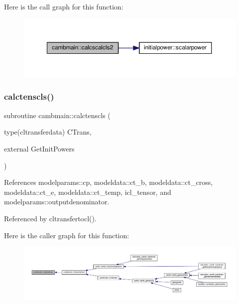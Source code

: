 Here is the call graph for this function\+:
\nopagebreak
\begin{figure}[H]
\begin{center}
\leavevmode
\includegraphics[width=350pt]{namespacecambmain_a89e57ae788ae9b3065000febda0566a5_cgraph}
\end{center}
\end{figure}
\mbox{\label{namespacecambmain_a412610e13dd6e264ce9d9ac33e0fbc1f}} 
\subsubsection{\texorpdfstring{calctenscls()}{calctenscls()}}
{\footnotesize\ttfamily subroutine cambmain\+::calctenscls (\begin{DoxyParamCaption}\item[{type(cltransferdata)}]{C\+Trans,  }\item[{external}]{Get\+Init\+Powers }\end{DoxyParamCaption})\hspace{0.3cm}{\ttfamily [private]}}



References modelparams\+::cp, modeldata\+::ct\+\_\+b, modeldata\+::ct\+\_\+cross, modeldata\+::ct\+\_\+e, modeldata\+::ct\+\_\+temp, icl\+\_\+tensor, and modelparams\+::outputdenominator.



Referenced by cltransfertocl().

Here is the caller graph for this function\+:
\nopagebreak
\begin{figure}[H]
\begin{center}
\leavevmode
\includegraphics[width=350pt]{namespacecambmain_a412610e13dd6e264ce9d9ac33e0fbc1f_icgraph}
\end{center}
\end{figure}
\mbox{\label{namespacecambmain_ad933d804e4a0a4ae8bdf2754e608458d}} 
